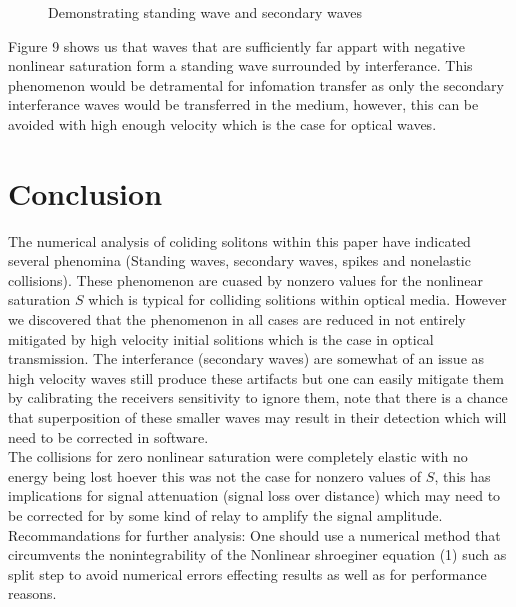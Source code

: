 \documentclass{article}
\begin{document}
\begin{enumerate}
\begin{figure}
\caption{Demonstrating standing wave and secondary waves}
\end{figure}
Figure 9 shows us that waves that are sufficiently far appart with negative nonlinear saturation form a standing wave surrounded by interferance. This phenomenon would be detramental for infomation transfer as only the secondary interferance waves would be transferred in the medium, however, this can be avoided with high enough velocity which is the case for optical waves. 
\end{enumerate}
\pagebreak
\section{Conclusion}
The numerical analysis of coliding solitons within this paper have indicated several phenomina (Standing waves, secondary waves, spikes and nonelastic collisions). These phenomenon are cuased by nonzero values for the nonlinear saturation $S$ which is typical for colliding solitions within optical media. However we discovered that the phenomenon in all cases are reduced in not entirely mitigated by high velocity initial solitions which is the case in optical transmission. The interferance (secondary waves) are somewhat of an issue as high velocity waves still produce these artifacts but one can easily mitigate them by calibrating the receivers sensitivity to ignore them, note that there is a chance that superposition of these smaller waves may result in their detection which will need to be corrected in software. \\
The collisions for zero nonlinear saturation were completely elastic with no energy being lost hoever this was not the case for nonzero values of $S$, this has implications for signal attenuation (signal loss over distance) which may need to be corrected for by some kind of relay to amplify the signal amplitude. \\
Recommandations for further analysis: One should use a numerical method that circumvents the nonintegrability of the Nonlinear shroeginer equation (1) such as split step to avoid numerical errors effecting results as well as for performance reasons. 
\end{document}
